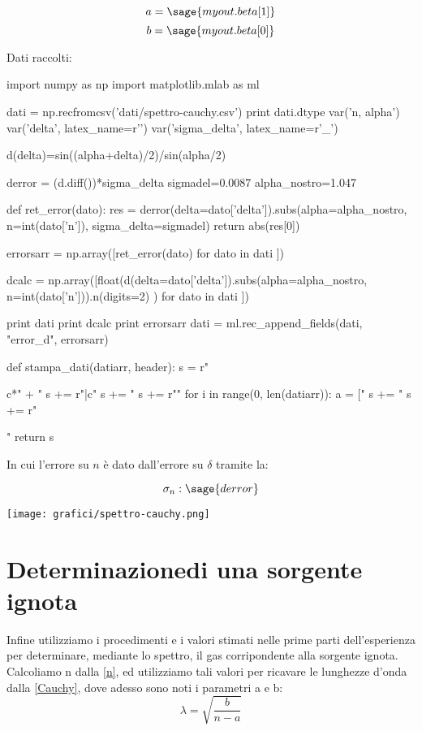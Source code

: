 $$a = \sage{myout.beta[1]}$$
$$b = \sage{myout.beta[0]}$$

Dati raccolti:


\begin{sagesilent}
import numpy as np
import matplotlib.mlab as ml

dati = np.recfromcsv('dati/spettro-cauchy.csv')
print dati.dtype
var('n, alpha')
var('delta', latex_name=r'\delta')
var('sigma_delta', latex_name=r'\sigma_{\delta}')

d(delta)=sin((alpha+delta)/2)/sin(alpha/2)

derror = (d.diff())*sigma_delta
sigmadel=0.0087
alpha_nostro=1.047


def ret_error(dato):
  res = derror(delta=dato['delta']).subs(alpha=alpha_nostro, n=int(dato['n']),
                    sigma_delta=sigmadel)
  return abs(res[0])
  
errorsarr = np.array([ret_error(dato) for dato in dati ])

dcalc = np.array([float(d(delta=dato['delta']).subs(alpha=alpha_nostro, n=int(dato['n'])).n(digits=2) ) for dato in dati ])

print dati
print dcalc
print errorsarr
dati = ml.rec_append_fields(dati, "error_d", errorsarr)

def stampa_dati(datiarr, header):
  s = r"\begin{tabular}{c*{" + "%
  s += r"}{|c}}"
  s += "%
  s += r"\midrule"
  for i in range(0, len(datiarr)):
    a = ["%
    s += "%
  s += r"\end{tabular}"
  return s
\end{sagesilent}

\begin{center}
\end{center}


In cui l'errore su $n$ è dato dall'errore su $\delta$ tramite la:

$$\sigma_n: \sage{derror}$$



\begin{center}
\texttt{[image: grafici/spettro-cauchy.png]}
\end{center}


\section*{Determinazionedi una sorgente ignota}
Infine utilizziamo i procedimenti e i valori stimati nelle prime parti dell'esperienza  per determinare, mediante lo spettro, il gas corripondente alla sorgente ignota.\\

Calcoliamo n dalla \ref{n}, ed utilizziamo tali valori per ricavare le lunghezze d'onda dalla \ref{Cauchy}, dove adesso sono noti i parametri a e b:
\begin{equation}
\lambda = \sqrt{\frac{b}{n-a}}
\end{equation}


